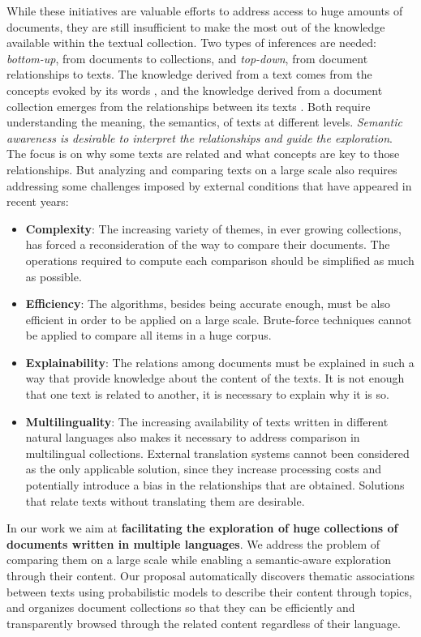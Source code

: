 While these initiatives are valuable efforts to address access to huge amounts of documents, they are still insufficient to make the most out of the knowledge available within the textual collection. Two types of inferences are needed: \textit{bottom-up}, from documents to collections, and \textit{top-down}, from document relationships to texts. The knowledge derived from a text comes from the concepts evoked by its words \citep{Griffiths2007}, and the knowledge derived from a document collection emerges from the relationships between its texts \citep{Kenter2015}. Both require understanding the meaning, the semantics, of texts at different levels. \textit{Semantic awareness is desirable to interpret the relationships and guide the exploration}. The focus is on why some texts are related and what concepts are key to those relationships. But analyzing and comparing texts on a large scale also requires addressing some challenges imposed by external conditions that have appeared in recent years:
\begin{itemize}
\item \textbf{Complexity}: The increasing variety of themes, in ever growing collections, has forced a reconsideration of the way to compare their documents. The operations required to compute each comparison should be simplified as much as possible.
\item \textbf{Efficiency}: The algorithms, besides being accurate enough, must be also efficient in order to be applied on a large scale. Brute-force techniques cannot be applied to compare all items in a huge corpus.
\item \textbf{Explainability}: The relations among documents must be explained in such a way that provide knowledge about the content of the texts. It is not enough that one text is related to another, it is necessary to explain why it is so. 
\item \textbf{Multilinguality}: The increasing availability of texts written in different natural languages also makes it necessary to address comparison in multilingual collections. External translation systems cannot been considered as the only applicable solution, since they increase processing costs and potentially introduce a bias in the relationships that are obtained. Solutions that relate texts without translating them are desirable.
\end{itemize}

In our work we aim at \textbf{facilitating the exploration of huge collections of documents written in multiple languages}. We address the problem of comparing them on a large scale while enabling a semantic-aware exploration through their content. Our proposal automatically discovers thematic associations between texts using probabilistic models to describe their content through topics, and organizes document collections so that they can be efficiently and transparently browsed through the related content regardless of their language.

